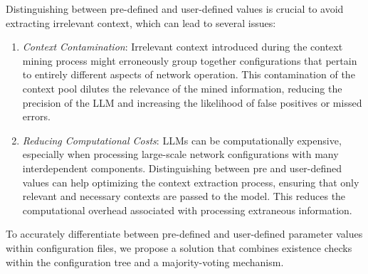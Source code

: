 Distinguishing between pre-defined and user-defined values is crucial to avoid extracting irrelevant context, which can lead to several issues:

\begin{enumerate}
    \item \textit{Context Contamination}: 
    Irrelevant context introduced during the context mining process might erroneously group together configurations that pertain to entirely different aspects of network operation.
    This contamination of the context pool dilutes the relevance of the mined information, reducing the precision of the LLM and increasing the likelihood of false positives or missed errors. 
    \item \textit{Reducing Computational Costs}: LLMs can be computationally expensive, especially when processing large-scale network configurations with many interdependent components. Distinguishing between pre and user-defined values can help optimizing the context extraction process, ensuring that only relevant and necessary contexts are passed to the model. This reduces the computational overhead associated with processing extraneous information.

\end{enumerate}

To accurately differentiate between pre-defined and user-defined parameter values within configuration files, we propose a solution that combines existence checks within the configuration tree and a majority-voting mechanism.

